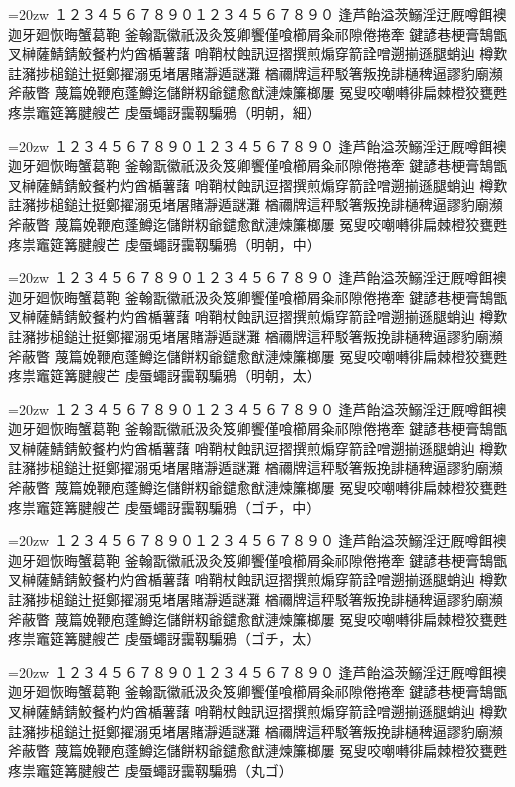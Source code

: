 \documentclass[uplatex]{jsarticle}
\begin{document}
\def\R{\par\noindent%
  \vbox{\LARGE\hsize=20zw\noindent\kanjiskip=0pt
  １２３４５６７８９０１２３４５６７８９０
  逢芦飴溢茨鰯淫迂厩噂餌襖迦牙廻恢晦蟹葛鞄
  釜翰翫徽祇汲灸笈卿饗僅喰櫛屑粂祁隙倦捲牽
  鍵諺巷梗膏鵠甑叉榊薩鯖錆鮫餐杓灼酋楯薯藷
  哨鞘杖蝕訊逗摺撰煎煽穿箭詮噌遡揃遜腿蛸辿
  樽歎註瀦捗槌鎚辻挺鄭擢溺兎堵屠賭瀞遁謎灘
  楢禰牌這秤駁箸叛挽誹樋稗逼謬豹廟瀕斧蔽瞥
  蔑篇娩鞭庖蓬鱒迄儲餅籾爺鑓愈猷漣煉簾榔屢
  冤叟咬嘲囀徘扁棘橙狡甕甦疼祟竈筵篝腱艘芒
  虔蜃蠅訝靄靱騙鴉}}

\selectfont \R（明朝，細）
\selectfont \R（明朝，中）
\selectfont \R（明朝，太）
\selectfont \R（ゴチ，中）
\selectfont \R（ゴチ，太）
\selectfont \R（丸ゴ）
\end{document}
